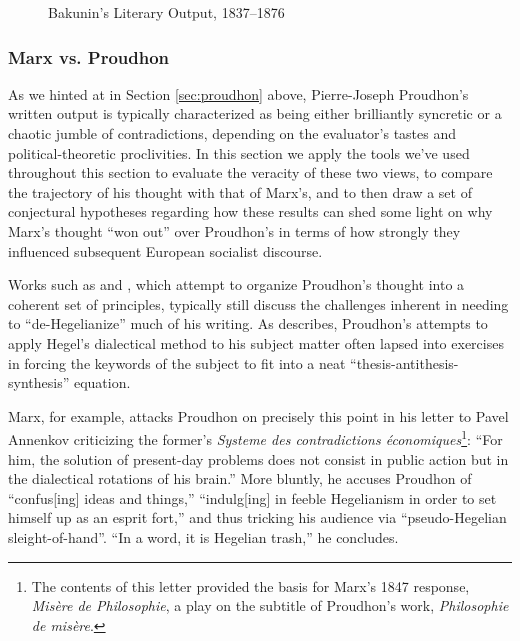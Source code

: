 \begin{figure}
    \centering
    
    \caption{Bakunin's Literary Output, 1837--1876}
    \label{fig:bakuninpubs}
\end{figure}


\subsubsection{Marx vs. Proudhon\label{sec:marxvproudhon}}

As we hinted at in Section \ref{sec:proudhon} above, Pierre-Joseph Proudhon's written output is typically characterized as being either brilliantly syncretic or a chaotic jumble of contradictions, depending on the evaluator's tastes and political-theoretic proclivities. In this section we apply the tools we've used throughout this section to evaluate the veracity of these two views, to compare the trajectory of his thought with that of Marx's, and to then draw a set of conjectural hypotheses regarding how these results can shed some light on why Marx's thought ``won out'' over Proudhon's in terms of how strongly they influenced subsequent European socialist discourse.

Works such as \cite{woodcock_proudhon_1956} and \cite{hoffman_revolutionary_1972}, which attempt to organize Proudhon's thought into a coherent set of principles, typically still discuss the challenges inherent in needing to ``de-Hegelianize'' much of his writing. As \cite{hoffman_revolutionary_1972} describes, Proudhon's attempts to apply Hegel's dialectical method to his subject matter often lapsed into exercises in forcing the keywords of the subject to fit into a neat ``thesis-antithesis-synthesis'' equation.

Marx, for example, attacks Proudhon on precisely this point in his letter to Pavel Annenkov criticizing the former's \textit{Systeme des contradictions économiques}\footnote{The contents of this letter provided the basis for Marx's 1847 response, \textit{Misère de Philosophie}, a play on the subtitle of Proudhon's work, \textit{Philosophie de misère}.}: ``For him, the solution of present-day problems does not consist in public action but in the dialectical rotations of his brain.'' More bluntly, he accuses Proudhon of ``confus[ing] ideas and things,'' ``indulg[ing] in feeble Hegelianism in order to set himself up as an esprit fort,'' and thus tricking his audience via ``pseudo-Hegelian sleight-of-hand''. ``In a word, it is Hegelian trash,'' he concludes.

